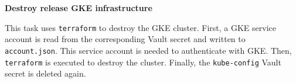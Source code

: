 \textbf{Destroy release GKE infrastructure}

This task uses \verb|terraform| to destroy the GKE cluster.
First, a GKE service account is read from the corresponding Vault secret and written to \verb|account.json|.
This service account is needed to authenticate with GKE.
Then, \verb|terraform| is executed to destroy the cluster.
Finally, the \verb|kube-config| Vault secret is deleted again.
